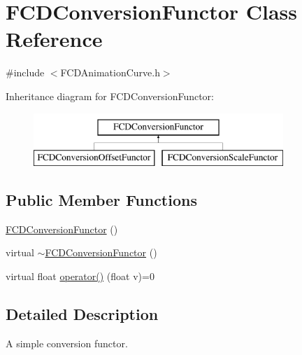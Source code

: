 \hypertarget{classFCDConversionFunctor}{
\section{FCDConversionFunctor Class Reference}
\label{classFCDConversionFunctor}
}


{\ttfamily \#include $<$FCDAnimationCurve.h$>$}

Inheritance diagram for FCDConversionFunctor:\begin{figure}[H]
\begin{center}
\leavevmode
\includegraphics[height=2.000000cm]{classFCDConversionFunctor}
\end{center}
\end{figure}
\subsection*{Public Member Functions}
\begin{DoxyCompactItemize}
\item 
\hyperlink{classFCDConversionFunctor_aab15aedc7c2a7d0432d4fbd67c8b903c}{FCDConversionFunctor} ()
\item 
virtual \hyperlink{classFCDConversionFunctor_a7c986aa2bba9d01376c1f8eeae40e14f}{$\sim$FCDConversionFunctor} ()
\item 
virtual float \hyperlink{classFCDConversionFunctor_af94a77c95015ec514d041b9c71a549e2}{operator()} (float v)=0
\end{DoxyCompactItemize}


\subsection{Detailed Description}
A simple conversion functor. 

